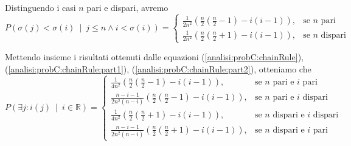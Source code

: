 \documentclass[../../../relazione.tex]{subfiles}
\begin{document}
Distinguendo i casi $n$ pari e dispari, avremo
\begin{equation}\label{analisi:probC:chainRule:part2}
  P(\sigma(j) < \sigma(i)\ \mid\ j \leq n \wedge i < \sigma(i)) =
  \begin{cases}
    \frac{1}{2n^2}\left( \frac{n}{2} \left(\frac{n}{2}-1\right) - i(i-1) \right), & \mbox{se $n$ pari} \\
    \frac{1}{2n^2}\left( \frac{n}{2} \left(\frac{n}{2}+1\right) - i(i-1) \right), & \mbox{se $n$ dispari}
  \end{cases}
\end{equation}

Mettendo insieme i risultati ottenuti dalle equazioni (\ref{analisi:probC:chainRule}), (\ref{analisi:probC:chainRule:part1}), (\ref{analisi:probC:chainRule:part2}), otteniamo che
\begin{equation}
  P(\exists j : i(j)\ \mid\ i \in \mathbb{R}) =
  \begin{cases}
    \frac{1}{4n^2}\left( \frac{n}{2} \left(\frac{n}{2}-1\right) - i(i-1) \right), & \mbox{se $n$ pari e $i$ pari} \\
    \frac{n-i-1}{2n^2(n-i)}\left( \frac{n}{2} \left(\frac{n}{2}-1\right) - i(i-1) \right), & \mbox{se $n$ pari e $i$ dispari} \\
    \frac{1}{4n^2}\left( \frac{n}{2} \left(\frac{n}{2}+1\right) - i(i-1) \right), & \mbox{se $n$ dispari e $i$ dispari} \\
    \frac{n-i-1}{2n^2(n-i)}\left( \frac{n}{2} \left(\frac{n}{2}+1\right) - i(i-1) \right), & \mbox{se $n$ dispari e $i$ pari}
  \end{cases}
\end{equation}
\end{document}
